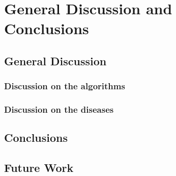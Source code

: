 \chapter{General Discussion and Conclusions}\label{ch:discusion}
\section{General Discussion}
\subsection{Discussion on the algorithms}

\subsection{Discussion on the diseases}

\section{Conclusions}

\section{Future Work}
